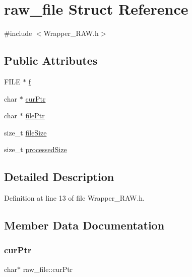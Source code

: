 \hypertarget{structraw__file}{}\section{raw\+\_\+file Struct Reference}
\label{structraw__file}


{\ttfamily \#include $<$Wrapper\+\_\+\+R\+A\+W.\+h$>$}

\subsection*{Public Attributes}
\begin{DoxyCompactItemize}
\item 
F\+I\+LE $\ast$ \mbox{\hyperlink{structraw__file_ac211dbcdb304fa78dc231c939233ca48}{f}}
\item 
char $\ast$ \mbox{\hyperlink{structraw__file_a21f1f2ca29c97f8786a938da639fb5fd}{cur\+Ptr}}
\item 
char $\ast$ \mbox{\hyperlink{structraw__file_a426ecbe92162fd69a119b7d3d5a299a4}{file\+Ptr}}
\item 
size\+\_\+t \mbox{\hyperlink{structraw__file_ac3744b3c64b2b9d16e5f709c384e9132}{file\+Size}}
\item 
size\+\_\+t \mbox{\hyperlink{structraw__file_ac7ea6a97f86f1d5dcf21a542d596e6ae}{processed\+Size}}
\end{DoxyCompactItemize}


\subsection{Detailed Description}


Definition at line 13 of file Wrapper\+\_\+\+R\+A\+W.\+h.



\subsection{Member Data Documentation}
\mbox{\label{structraw__file_a21f1f2ca29c97f8786a938da639fb5fd}} 
\subsubsection{\texorpdfstring{cur\+Ptr}{curPtr}}
{\footnotesize\ttfamily char$\ast$ raw\+\_\+file\+::cur\+Ptr}



